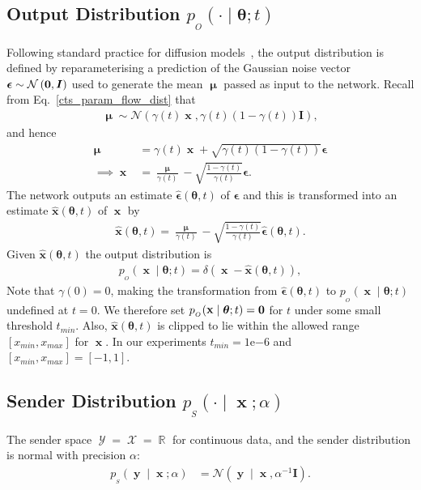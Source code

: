 \documentclass[11pt,table]{article}
\DeclareMathOperator{\x}{\mathbf{x}}
\DeclareMathOperator{\X}{\mathcal{X}}
\DeclareMathOperator{\y}{\mathbf{y}}
\DeclareMathOperator{\Y}{\mathcal{Y}}
\DeclareMathOperator{\m}{\boldsymbol{\mu}}
\newcommand{\N}[2]{\mathcal{N}\left(#1 , #2\right)}
\DeclareMathOperator{\R}{\mathbb{R}}
\newcommand{\I}[1]{\boldsymbol{I}}
\renewcommand{\vec}[1]{\boldsymbol{#1}}
\newcommand{\pars}{\theta}
\newcommand{\parsn}{\vec{\pars}}
\newcommand{\0}[1]{\constvec{0}{#1}}
\newcommand{\1}[1]{\constvec{1}{#1}}
\newcommand{\sender}[2]{p_{_S}\left(#1 \mid #2\right)}
\newcommand{\out}{p_{_O}}
\newcommand{\pred}[1]{\hat{#1}}
\newcommand{\eps}{\vec{\pred{\epsilon}}}
\begin{document}
\subsection{Output Distribution \texorpdfstring{$\out(\cdot \mid \parsn; t)$}{}}\label{sec:cts_output}
Following standard practice for diffusion models~\citep{song2020score}, the output distribution is defined by reparameterising a prediction of the Gaussian noise vector $\vec{\epsilon} \sim \N{\0{D}}{\I{D}}$ used to generate the mean $\m$ passed as input to the network.
Recall from Eq.~\ref{cts_param_flow_dist} that
\begin{align}
\m \sim  \N{\gamma(t)\x}{\gamma(t)(1-\gamma(t))\I{D}},
\end{align}
and hence
\begin{align}
\m &= \gamma(t)\x + \sqrt{\gamma(t)(1-\gamma(t))} \vec{\epsilon}\\
\implies \x &= \frac{\m}{\gamma(t)}- \sqrt{\frac{1-\gamma(t)}{\gamma(t)}}\vec{\epsilon}.
\end{align}
The network outputs an estimate $\eps(\parsn, t)$ of $\vec{\epsilon}$ and this is transformed into an estimate $\mathbf{\pred{x}}(\parsn, t)$ of $\x$ by 
\begin{align}
\mathbf{\pred{x}}(\parsn, t) = \frac{\m}{\gamma(t)} - \sqrt{\frac{1-\gamma(t)}{\gamma(t)}}\eps(\parsn, t).
\end{align}
Given $\vec{\pred{x}}(\parsn, t)$ the output distribution is
\begin{align}
\out(\x \mid \parsn; t) = \delta(\x-\mathbf{\pred{x}}(\parsn, t))\label{cts_p_dist},
\end{align}
Note that $\gamma(0) = 0$, making the transformation from $\eps(\parsn, t)$ to $\out(\x \mid \parsn; t)$ undefined at $t=0$. 
We therefore set $\out(\x \mid \parsn; t) = \0{D}$ for $t$ under some small threshold $t_{min}$.
Also,  $\mathbf{\pred{x}}(\parsn, t)$ is clipped to lie within the allowed range $[x_{min}, x_{max}]$ for $\x$.
In our experiments $t_{min} = 1\mathrm{e}{-6}$ and $[x_{min}, x_{max}] = [-1, 1]$.
\subsection{Sender Distribution \texorpdfstring{$\sender{\cdot}{\x; \alpha}$}{}}\label{sec:cts_sender}
The sender space $\Y = \X = \R$ for continuous data, and the sender distribution is normal with precision $\alpha$:
\begin{align}
\sender{\y}{\x; \alpha} &= \N{\y \mid \x}{\alpha^{-1}\I{D}}\label{cts_q_dist}.
\end{align}
\end{document}
